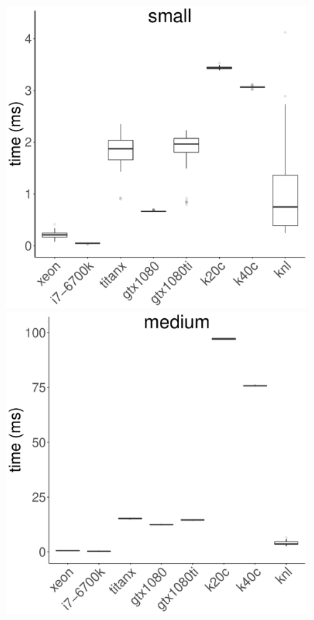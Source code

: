 \documentclass[../document.tex]{subfiles}
\begin{document}
\begin{figure}[t]
	\includegraphics[width=\plotwidth]{figures/time-results/generate_crc_small_boxplot_knl-1}
	\includegraphics[width=\plotwidth]{figures/time-results/generate_crc_medium_boxplot_knl-1}

\end{figure}
\end{document}

